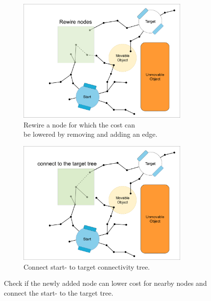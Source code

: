 \begin{figure}[H]
    \centering
    \begin{subfigure}{.49\textwidth}
    \centering
    \includegraphics[width=0.93\textwidth, cfbox=my_green 5pt 0pt]{figures/required_background/mp/5mp_rewire.drawio.png}
    \caption{Rewire a node for which the cost can\\be lowered by removing and adding an edge.}%
    \label{subfig:mp_rewire}
    \end{subfigure}
    \begin{subfigure}{.49\textwidth}
    \centering
    \includegraphics[width=0.93\textwidth, cfbox=my_green 5pt 0pt]{figures/required_background/mp/6mp_search_other_tree.drawio.png}
    \caption{Connect start- to target connectivity tree.\bs}
    \end{subfigure}
    \caption{Check if the newly added node can lower cost for nearby nodes and connect the start- to the target tree.}
    \label{fig:motion_planner_adding_one_node_tree}
\end{figure}

